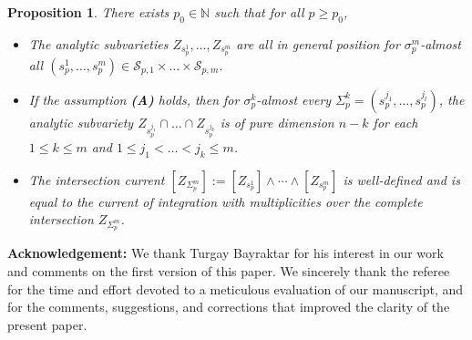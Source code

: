 \documentclass[11pt,leqno,oneside]{amsart}
\newtheorem{prop}[thm]{Proposition}
\numberwithin{equation}{section}
\begin{document}
\begin{prop} \label{wdberti}
	There exists $p_{0} \in \mathbb{N}$ such that for all $p \geq p_{0}$,
	\begin{itemize}
		\item [(i)] The analytic subvarieties $Z_{s^{1}_{p}}, \ldots, Z_{s^{m}_{p}}$ are all in general position for $\sigma^{m}_{p}$-almost all $(s^{1}_{p}, \ldots, s_{p}^{m}) \in \mathcal{S}_{p, 1} \times \ldots \times \mathcal{S}_{p, m}$.
		\item [(ii)] If the assumption \textbf{(A)} holds, then for $\sigma^{k}_{p}$-almost every $\Sigma^{k}_{p}=(s^{j_{1}}_{p}, \ldots, s^{j_{l}}_{p})$, the analytic subvariety $Z_{s^{j_{1}}_{p}} \cap \ldots \cap Z_{s^{j_{k}}_{p}}$ is of pure dimension $n-k$ for each $1\leq k \leq m$ and $1\leq j_{1}<\ldots<j_{k}\leq m$.
		\item [(iii)] The intersection current $[Z_{\Sigma^{m}_{p}}]:=[Z_{s^{1}_{p}}]\wedge \cdots \wedge[Z_{s_{p}^{m}}]$ is well-defined and is equal to the current of integration with multiplicities over the complete intersection $Z_{\Sigma^{m}_{p}}$.	
	\end{itemize}
\end{prop}











\textbf{Acknowledgement:} We thank Turgay Bayraktar for his interest in our work and comments on the first version of this paper. We sincerely thank the referee for the time and effort devoted to a meticulous evaluation of our manuscript, and for the comments, suggestions, and corrections that improved the clarity of the present paper.
\end{document}
